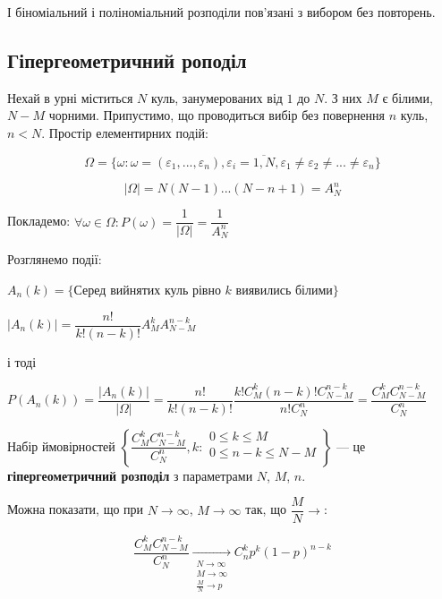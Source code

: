 \begin{remark}
    І біноміальний і поліноміальний розподіли пов'язані з вибором без повторень.
\end{remark}

\subsection{Гіпергеометричний роподіл}

Нехай в урні міститься $N$ куль, занумерованих від $1$ до $N$. З них $M$ є білими,
$N-M$ чорними. Припустимо, що проводиться вибір без повернення $n$ куль,
$n < N$. Простір елементирних подій: 

$$\Omega = \{\omega: \omega = (\varepsilon_1, ..., \varepsilon_n),
    \varepsilon_i = \overline{1, N},
    \varepsilon_1 \neq \varepsilon_2 \neq ... \neq \varepsilon_n\}$$

$$|\Omega| = N(N-1)...(N-n+1) = A_N^n$$

Покладемо: $\forall \omega \in \Omega: P(\omega) = \dfrac{1}{|\Omega|} = \dfrac{1}{A_N^n}$

Розглянемо події:

$A_n(k) = \{$Серед  вийнятих куль рівно $k$ виявились білими$\}$

$|A_n(k)| = \dfrac{n!}{k!(n-k)!} A_M^k A_{N-M}^{n-k}$

і тоді 

$P(A_n(k)) = \dfrac{|A_n(k)|}{|\Omega|}
= \dfrac{n!}{k!(n-k)!} \dfrac{k! C_M^k (n-k)! C_{N-M}^{n-k}}{n!C_N^n}
= \dfrac{C_M^k C_{N-M}^{n-k}}{C_N^n}$
\begin{definition}    
    Набір ймовірностей 
    $\left\{ \dfrac{C_M^k C_{N-M}^{n-k}}{C_N^n}, k: \begin{array}{l}
        0 \leqslant k \leqslant M \\
        0 \leqslant n-k \leqslant N-M \\
    \end{array} \right\}$ --- це \textbf{гіпергеометричний розподіл}
    з параметрами $N$, $M$, $n$.
\end{definition}

Можна показати, що при $N \rightarrow \infty$, $M \rightarrow \infty$
так, що $\dfrac{M}{N} \rightarrow$:

$$\dfrac{C_M^k C_{N-M}^{n-k}}{C_N^n} \xrightarrow[\begin{matrix}
    \scriptstyle N \rightarrow \infty\\
    \scriptstyle M \rightarrow \infty\\
    \scriptstyle \frac{M}{N} \rightarrow p\\
\end{matrix}]{} C_n^k p^k(1-p)^{n-k}$$

